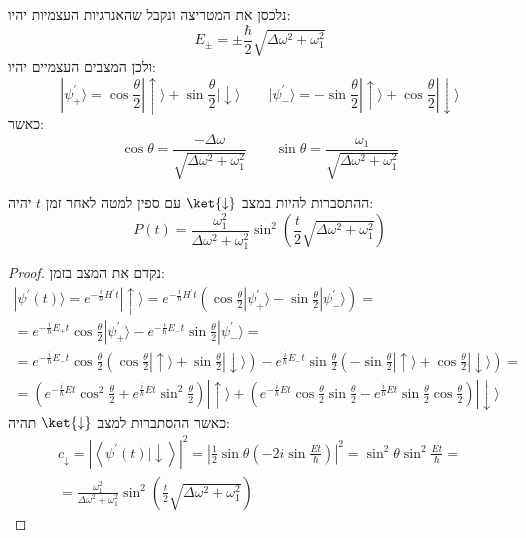 \documentclass{tstextbook}
\begin{document}
נלכסן את המטריצה ונקבל שהאנרגיות העצמיות יהיו:
$$E_{\pm}= \pm \frac{\hbar}{2}\sqrt{ \Delta \omega^{2}+\omega_{1}^{2} }$$
ולכן המצבים העצמיים יהיו:
$$|\psi_{+}^{\prime}\rangle=\cos\frac{\theta}{2}|\uparrow\rangle+\sin\frac{\theta}{2}|\downarrow\rangle\qquad|\psi_{-}^{\prime}\rangle=-\sin\frac{\theta}{2}|\uparrow\rangle+\cos\frac{\theta}{2}|\downarrow\rangle$$
כאשר:
$$\cos\theta=\frac{-\Delta\omega}{\sqrt{\Delta\omega^{2}+\omega_{1}^{2}}}\qquad\sin\theta=\frac{\omega_{1}}{\sqrt{\Delta\omega^{2}+\omega_{1}^{2}}}$$

\begin{corollary}
ההתסברות להיות במצב \(\ket{\downarrow}\) עם ספין למטה לאחר זמן \(t\) יהיה:
$$P(t)=\frac{\omega_{1}^{2}}{\Delta\omega^{2}+\omega_{1}^{2}}\sin^{2}\left(\frac{t}{2}\sqrt{\Delta\omega^{2}+\omega_{1}^{2}}\right) $$

\end{corollary}
\begin{proof}
נקדם את המצב בזמן:
\begin{gather*}|\psi^{\prime}(t)\rangle=e^{-\frac{i}{\hbar}H^{\prime}t}|\uparrow\rangle=e^{-\frac{i}{\hbar}H^{\prime}t}\left(\cos\frac{\theta}{2}|\psi_{+}^{\prime}\rangle-\sin\frac{\theta}{2}|\psi_{-}^{\prime}\rangle\right)=\\= e^{-\frac{i}{\hbar}E_{+}t}\cos\frac{\theta}{2}|\psi_{+}^{\prime}\rangle-e^{-\frac{i}{\hbar}E_{-}t}\sin\frac{\theta}{2}|\psi_{-}^{\prime}\rangle=\\=e^{-\frac{i}{\hbar}E_{-}t}\cos\frac{\theta}{2}\left(\cos\frac{\theta}{2}|\uparrow\rangle+\sin\frac{\theta}{2}|\downarrow\rangle\right)-e^{\frac{i}{\hbar}E_{-}t}\sin\frac{\theta}{2}\left(-\sin\frac{\theta}{2}|\uparrow\rangle+\cos\frac{\theta}{2}|\downarrow\rangle\right)=\\= \left(e^{-\frac{i}{\hbar}E t}\cos^{2}{\frac{\theta}{2}}+e^{\frac{i}{\hbar}E t}\sin^{2}{\frac{\theta}{2}}\right)|\uparrow\rangle+\left(e^{-\frac{i}{\hbar}E t}\cos{\frac{\theta}{2}}\sin{\frac{\theta}{2}}-e^{\frac{i}{\hbar}E t}\sin{\frac{\theta}{2}}\cos{\frac{\theta}{2}}\right)|\downarrow\rangle 
\end{gather*}
כאשר ההסתברות למצב \(\ket{\downarrow}\) תהיה:
\begin{gather*}c_{\downarrow}=|\left\langle \psi^{\prime}(t)|\downarrow \right\rangle|^{2}=|\frac{1}{2}\sin\theta\left(-2i\sin\frac{E t}{\hbar}\right)|^{2}=\sin^{2}\theta\sin^{2}\frac{E t}{\hbar}=\\=\frac{\omega_{1}^{2}}{\Delta\omega^{2}+\omega_{1}^{2}}\sin^{2}\left(\frac{t}{2}\sqrt{\Delta\omega^{2}+\omega_{1}^{2}}\right) 
\end{gather*}

\end{proof}
\end{document}
